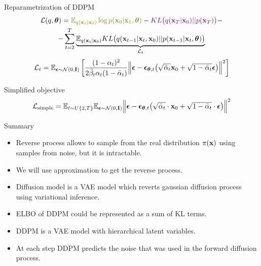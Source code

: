 \begin{frame}{Reparametrization of DDPM}
	\begin{multline*}
		\cL(q, \btheta) =  {\color{olive}\bbE_{q(\bx_1 | \bx_0)} \log p(\bx_0 | \bx_1, \btheta)} - {\color{violet}KL\bigl(q(\bx_T | \bx_0) || p(\bx_T)\bigr)} - \\
		- \sum_{t=2}^T \underbrace{ \bbE_{q(\bx_t | \bx_0)} KL \bigl(q(\bx_{t-1} | \bx_t, \bx_0) || p(\bx_{t - 1} | \bx_t, \btheta )\bigr)}_{\cL_t}
	\end{multline*}
	\vspace{-0.3cm}
	\[
		\mathcal{L}_t  = \mathbb{E}_{\boldsymbol{\epsilon} \sim \mathcal{N}(0, \mathbf{I})} \left[ \frac{(1 - \alpha_t)^2}{2\tilde{\beta}_t \alpha_t (1 - \bar{\alpha}_t)} \Bigl\| \boldsymbol{\epsilon} - \boldsymbol{\epsilon}_{\boldsymbol{\theta}, t}\bigl( \sqrt{\bar{\alpha}_t} \mathbf{x}_0 + \sqrt{1 - \bar{\alpha}_t} \boldsymbol{\epsilon}\bigr) \Bigr\|^2 \right]
	\]
	\begin{block}{Simplified objective}
		\[
			 \mathcal{L}_{\text{simple}} = \mathbb{E}_{t \sim U\{2, T\}} \mathbb{E}_{\boldsymbol{\epsilon} \sim \mathcal{N}(0, \mathbf{I})} \Bigl\| \boldsymbol{\epsilon} - \boldsymbol{\epsilon}_{\boldsymbol{\theta}, t}\bigl( \sqrt{\bar{\alpha}_t} \cdot \mathbf{x}_0 + \sqrt{1 - \bar{\alpha}_t} \cdot \boldsymbol{\epsilon}\bigr) \Bigr\|^2 
		\]
	\end{block}
	\end{frame}
\begin{frame}{Summary}
	\begin{itemize}
		\item Reverse process allows to sample from the real distribution $\pi(\mathbf{x})$ using samples from noise, but it is intractable.
		\vfill
		\item We will use approximation to get the reverse process.		
		\vfill
		\item Diffusion model is a VAE model which reverts gaussian diffusion process using variational inference.
		\vfill
		\item ELBO of DDPM could be represented as a sum of KL terms.
		\vfill
		\item DDPM is a VAE model with hierarchical latent variables.
		\vfill
		\item At each step DDPM predicts the noise that was used in the forward diffusion process.
	\end{itemize}
\end{frame}
 